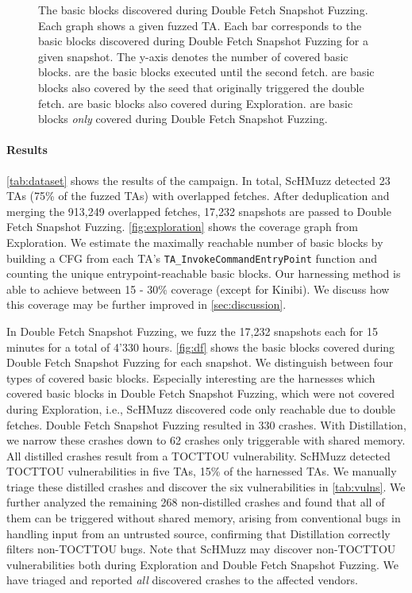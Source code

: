 \documentclass[letterpaper,twocolumn,10pt]{article}
\newcommand{\sysname}{ScHMuzz\xspace}
\newcommand{\stageone}{Exploration\xspace}
\newcommand{\stagetwo}{Double Fetch Snapshot Fuzzing\xspace}
\newcommand{\stagethree}{Distillation\xspace}
\newcommand{\kinibi}{Kinibi\xspace}
\newcommand{\numTAsdf}{23\xspace}
\newcommand{\numdfs}{913,249\xspace}
\newcommand{\numdfsmerge}{17,232\xspace}
\newcommand{\numcrashes}{330\xspace}
\newcommand{\numcrashesdistill}{62\xspace}
\newcommand{\numvulns}{six\xspace}
\newcommand{\numvulnTAs}{five\xspace}
\begin{document}
\begin{figure}
\begin{tikzpicture}
    \end{tikzpicture}
    \caption{
        The basic blocks discovered during \stagetwo. Each graph shows a given fuzzed TA. Each bar corresponds to the basic blocks discovered during \stagetwo for a given snapshot. The y-axis denotes the number of covered basic blocks.  
    \protect{} are the basic blocks executed until the second fetch. 
    \protect{} are basic blocks also covered by the seed that originally triggered the double fetch. 
    \protect{} are basic blocks also covered during \stageone. 
    \protect{} are basic blocks \emph{only} covered during \stagetwo. 
    }
    \label{fig:df}
\end{figure}

\paragraph{Results}

\autoref{tab:dataset} shows the results of the campaign. In total, \sysname detected 
\numTAsdf{} TAs (75\% of the fuzzed TAs) with overlapped fetches. 
After deduplication and merging the \numdfs{} overlapped fetches, \numdfsmerge snapshots 
are passed to \stagetwo. \autoref{fig:exploration} shows the coverage graph from \stageone. 
We estimate the maximally reachable number of basic blocks by building a CFG from each TA's
\texttt{TA\_InvokeCommandEntryPoint} function and counting the unique entrypoint-reachable basic blocks. 
Our harnessing method is able to achieve between 15 - 30\% coverage (except for \kinibi). 
We discuss how this coverage may be further improved in \autoref{sec:discussion}.

In \stagetwo, we fuzz the \numdfsmerge snapshots each for 15 minutes for a total of 4'330 hours. 
\autoref{fig:df} shows the basic blocks covered during \stagetwo for each snapshot. 
We distinguish between four types of covered basic blocks. Especially interesting are the harnesses which covered basic blocks in \stagetwo, which 
were not covered during \stageone, i.e., \sysname discovered code only reachable due to double 
fetches. \stagetwo resulted in \numcrashes crashes. With \stagethree, we narrow these crashes down to \numcrashesdistill crashes only triggerable with shared memory. 
All distilled crashes result from a TOCTTOU vulnerability. \sysname detected TOCTTOU vulnerabilities 
in \numvulnTAs TAs, 15\% of the harnessed TAs.
We manually triage these distilled 
crashes and discover the \numvulns{} vulnerabilities in \autoref{tab:vulns}. 
We further analyzed the remaining 268 non-distilled crashes and found that all of them can be triggered without 
shared memory, arising from conventional bugs in handling input from an untrusted source, confirming that \stagethree 
correctly filters non-TOCTTOU bugs. Note that \sysname may discover non-TOCTTOU vulnerabilities both during 
\stageone and \stagetwo. We have triaged and reported \emph{all} discovered crashes to the affected vendors.
\end{document}
